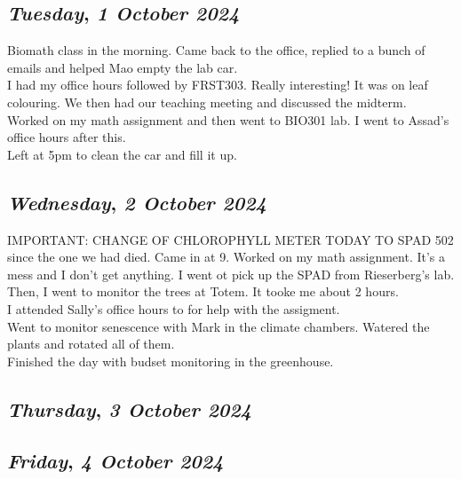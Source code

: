 \begin{center}
\section*{\month}
\end{center}

\def\day{\textit{1 October 2024}}
\def\weekday{\textit{Tuesday}}
\subsection*{\weekday, \day}
Biomath class in the morning. Came back to the office, replied to a bunch of emails and helped Mao empty the lab car.\\
I had my office hours followed by FRST303. Really interesting! It was on leaf colouring. We then had our teaching meeting and discussed the midterm.\\
Worked on my math assignment and then went to BIO301 lab. I went to Assad's office hours after this.\\
Left at 5pm to clean the car and fill it up.

\def\day{\textit{2 October 2024}}
\def\weekday{\textit{Wednesday}}
\subsection*{\weekday, \day}
IMPORTANT: CHANGE OF CHLOROPHYLL METER TODAY TO SPAD 502 since the one we had died. 
Came in at 9. Worked on my math assignment. It's a mess and I don't get anything. I went ot pick up the SPAD from Rieserberg's lab. Then, I went to monitor the trees at Totem. It tooke me about 2 hours. \\
I attended Sally's office hours to for help with the assigment.\\
Went to monitor senescence with Mark in the climate chambers. Watered the plants and rotated all of them.\\
Finished the day with budset monitoring in the greenhouse. 

\def\day{\textit{3 October 2024}}
\def\weekday{\textit{Thursday}}
\subsection*{\weekday, \day}

\def\day{\textit{4 October 2024}}
\def\weekday{\textit{Friday}}
\subsection*{\weekday, \day}

